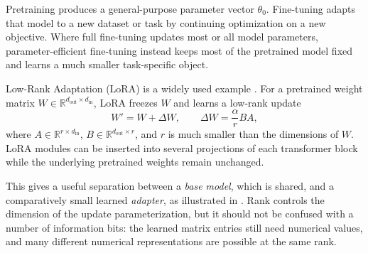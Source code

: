 Pretraining produces a general-purpose parameter vector $\theta_0$. Fine-tuning adapts that model to a new dataset or task by continuing optimization on a new objective. Where full fine-tuning updates most or all model parameters, parameter-efficient fine-tuning instead keeps most of the pretrained model fixed and learns a much smaller task-specific object.

Low-Rank Adaptation (LoRA) is a widely used example \parencite{hu2022lora}. For a pretrained weight matrix $W\in\mathbb{R}^{d_{\mathrm{out}}\times d_{\mathrm{in}}}$, LoRA freezes $W$ and learns a low-rank update
\begin{equation}
    W' = W + \Delta W,
    \qquad
    \Delta W = \frac{\alpha}{r}BA,
\end{equation}
where $A\in\mathbb{R}^{r\times d_{\mathrm{in}}}$, $B\in\mathbb{R}^{d_{\mathrm{out}}\times r}$, and $r$ is much smaller than the dimensions of $W$. LoRA modules can be inserted into several projections of each transformer block while the underlying pretrained weights remain unchanged.

This gives a useful separation between a \emph{base model}, which is shared, and a comparatively small learned \emph{adapter}, as illustrated in . Rank controls the dimension of the update parameterization, but it should not be confused with a number of information bits: the learned matrix entries still need numerical values, and many different numerical representations are possible at the same rank.

